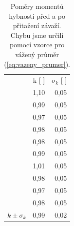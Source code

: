\documentclass[english]{article}
\begin{document}
\begin{table}[h!]
{}
\hfill
\parbox{.25\linewidth}{
\centering
        \begin{tabular}{|r|r|r|}
      \cline{2-3}    \multicolumn{1}{r|}{} & k [-] & $\sigma_k$ [-] \bigstrut\\
      \cline{2-3}    \multicolumn{1}{r|}{} & 1,10  & 0,05 \bigstrut\\
      \cline{2-3}    \multicolumn{1}{r|}{} & 0,99  & 0,05 \bigstrut\\
      \cline{2-3}    \multicolumn{1}{r|}{} & 0,97  & 0,05 \bigstrut\\
      \cline{2-3}    \multicolumn{1}{r|}{} & 0,98  & 0,05 \bigstrut\\
      \cline{2-3}    \multicolumn{1}{r|}{} & 0,98  & 0,05 \bigstrut\\
      \cline{2-3}    \multicolumn{1}{r|}{} & 0,99  & 0,05 \bigstrut\\
      \cline{2-3}    \multicolumn{1}{r|}{} & 1,01  & 0,05 \bigstrut\\
      \cline{2-3}    \multicolumn{1}{r|}{} & 0,98  & 0,05 \bigstrut\\
      \cline{2-3}    \multicolumn{1}{r|}{} & 0,97  & 0,05 \bigstrut\\
      \cline{2-3}    \multicolumn{1}{r|}{} & 0,98  & 0,05 \bigstrut\\
          \hline
          $k \pm \sigma_k$ & 0,99  & 0,02 \bigstrut\\
          \hline
          \end{tabular}%
        \caption{Poměry momentů hybností před a po přitažení závaží. Chybu jsme určili pomocí vzorce pro vážený průměr (\ref{eq:vazeny_prumer}).}
                \label{tab:zzmh_k}%

}

\end{table}
\end{document}

